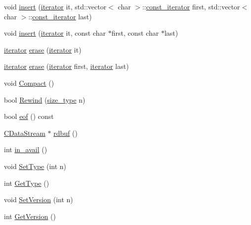 \begin{DoxyCompactItemize}
\item 
void \hyperlink{class_c_data_stream_aa15a60d7ee6d987de444426f2825f284}{insert} (\hyperlink{class_c_data_stream_abed2013224bdf424e51c78bf483886d3}{iterator} it, std\+::vector$<$ char $>$\+::\hyperlink{class_c_data_stream_abcfd79b72607505b22f18424e313b4c5}{const\+\_\+iterator} first, std\+::vector$<$ char $>$\+::\hyperlink{class_c_data_stream_abcfd79b72607505b22f18424e313b4c5}{const\+\_\+iterator} last)
\item 
void \hyperlink{class_c_data_stream_a9635fda38bc0b7836b4364820a67a18d}{insert} (\hyperlink{class_c_data_stream_abed2013224bdf424e51c78bf483886d3}{iterator} it, const char $\ast$first, const char $\ast$last)
\item 
\hyperlink{class_c_data_stream_abed2013224bdf424e51c78bf483886d3}{iterator} \hyperlink{class_c_data_stream_acb2a195db823f11161ea07c4855e0333}{erase} (\hyperlink{class_c_data_stream_abed2013224bdf424e51c78bf483886d3}{iterator} it)
\item 
\hyperlink{class_c_data_stream_abed2013224bdf424e51c78bf483886d3}{iterator} \hyperlink{class_c_data_stream_a7446b23bcfa37cbfa79ccc66f8aff48a}{erase} (\hyperlink{class_c_data_stream_abed2013224bdf424e51c78bf483886d3}{iterator} first, \hyperlink{class_c_data_stream_abed2013224bdf424e51c78bf483886d3}{iterator} last)
\item 
void \hyperlink{class_c_data_stream_a84c3fd4cf194f3402dc8adce6ab3ccf9}{Compact} ()
\item 
bool \hyperlink{class_c_data_stream_a7054311b2fe016b21fb853a1e27812d9}{Rewind} (\hyperlink{class_c_data_stream_a79e10daad6db0f94aea1e811eb167378}{size\+\_\+type} n)
\item 
bool \hyperlink{class_c_data_stream_abf5a9f3a26a56ef1ea1fb56b674677bf}{eof} () const 
\item 
\hyperlink{class_c_data_stream}{C\+Data\+Stream} $\ast$ \hyperlink{class_c_data_stream_a45a08b8355d47a95e9dae87ed6487483}{rdbuf} ()
\item 
int \hyperlink{class_c_data_stream_a0483fe7bccf16aa88bf7272f18a0a7b0}{in\+\_\+avail} ()
\item 
void \hyperlink{class_c_data_stream_a92467b36f5b2edff8becb5eadec633ce}{Set\+Type} (int n)
\item 
int \hyperlink{class_c_data_stream_a14bc0652cfd49850a032f0a1651456a7}{Get\+Type} ()
\item 
void \hyperlink{class_c_data_stream_a267d1315f3f9e9bcf9e7168beaa240c4}{Set\+Version} (int n)
\item 
int \hyperlink{class_c_data_stream_acb7af65ccac8273fc694a25796814ddc}{Get\+Version} ()

\end{DoxyCompactItemize}
